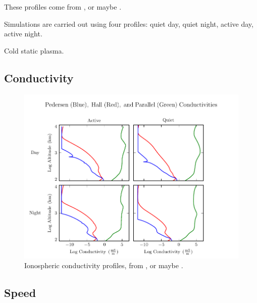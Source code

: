 These profiles come from \cite{lysak_2013}, or maybe \cite{kelley_1989}. 

Simulations are carried out using four profiles: quiet day, quiet night, active day, active night. 

Cold static plasma. 

\subsection{Conductivity}

\begin{figure}[H]
    \centering
    \includegraphics[width=\textwidth]{figures/sigma.pdf}
    \caption[Ionospheric Conductivity Profiles]{
      Ionospheric conductivity profiles, from \cite{lysak_2013}, or maybe \cite{kelley_1989}. 
    }
    \label{fig_sigma}
\end{figure}


\subsection{\Alfven Speed}

